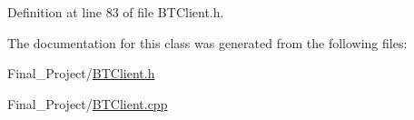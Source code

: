 Definition at line 83 of file B\-T\-Client.\-h.



The documentation for this class was generated from the following files\-:\begin{DoxyCompactItemize}
\item 
Final\-\_\-\-Project/\hyperlink{BTClient_8h}{B\-T\-Client.\-h}\item 
Final\-\_\-\-Project/\hyperlink{BTClient_8cpp}{B\-T\-Client.\-cpp}\end{DoxyCompactItemize}
